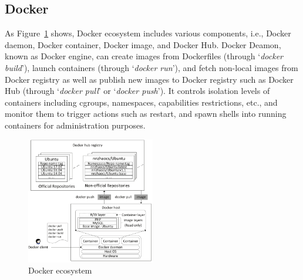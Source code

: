 \subsection{Docker}


As Figure~\ref{fig-docker-architecture} shows, Docker ecosystem includes various
components, i.e., Docker daemon, Docker container, Docker image, and Docker Hub.
%
Docker Deamon, known as Docker engine, can create images from Dockerfiles
(through `\textit{docker build}'), launch containers (through `\textit{docker run}'),
and fetch non-local images from Docker registry as well as publish new images to
Docker registry such as Docker Hub (through `\textit{docker pull}' or
`\textit{docker push}').
%
It controls isolation levels of containers including cgroups, namespaces,
capabilities restrictions, etc., and monitor them to trigger actions such as
restart, and spawn shells into running containers for administration purposes.
%


\begin{figure}
	\centering
	\includegraphics[width=0.5\textwidth]{graphs/fig-docker-architecture}
	\caption{Docker ecosystem}\label{fig-docker-architecture}
\end{figure}


